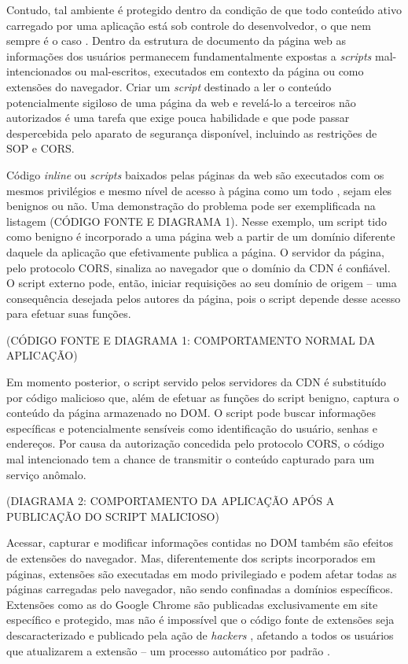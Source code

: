 Contudo, tal ambiente é protegido dentro da condição de que todo conteúdo ativo carregado por uma aplicação está sob controle do desenvolvedor, o que nem sempre é o caso \cite{Heule2015_Most_Dangerous_Code}. Dentro da estrutura de documento da página web as informações dos usuários permanecem fundamentalmente expostas a \textit{scripts} mal-intencionados ou mal-escritos, executados em contexto da página ou como extensões do navegador. Criar um \textit{script} destinado a ler o conteúdo potencialmente sigiloso de uma página da web e revelá-lo a terceiros não autorizados é uma tarefa que exige pouca habilidade e que pode passar despercebida pelo aparato de segurança disponível, incluindo as restrições de SOP e CORS.

Código \textit{inline} ou \textit{scripts} baixados pelas páginas da web são executados com os mesmos privilégios e mesmo nível de acesso à página como um todo \cite[p. 2-3]{DeRyck2012}, sejam eles benignos ou não. Uma demonstração do problema pode ser exemplificada na listagem (CÓDIGO FONTE E DIAGRAMA 1). Nesse exemplo, um script tido como benigno é incorporado a uma página web a partir de um domínio diferente daquele da aplicação que efetivamente publica a página. O servidor da página, pelo protocolo CORS, sinaliza ao navegador que o domínio da CDN é confiável. O script externo pode, então, iniciar requisições ao seu domínio de origem -- uma consequência desejada pelos autores da página, pois o script depende desse acesso para efetuar suas funções.

(CÓDIGO FONTE E DIAGRAMA 1: COMPORTAMENTO NORMAL DA APLICAÇÃO)

Em momento posterior, o script servido pelos servidores da CDN é substituído por código malicioso que, além de efetuar as funções do script benigno, captura o conteúdo da página armazenado no DOM. O script pode buscar informações específicas e potencialmente sensíveis como identificação do usuário, senhas e endereços. Por causa da autorização concedida pelo protocolo CORS, o código mal intencionado tem a chance de transmitir o conteúdo capturado para um serviço anômalo.

(DIAGRAMA 2: COMPORTAMENTO DA APLICAÇÃO APÓS A PUBLICAÇÃO DO SCRIPT MALICIOSO)

Acessar, capturar e modificar informações contidas no DOM também são efeitos de extensões do navegador. Mas, diferentemente dos scripts incorporados em páginas, extensões são executadas em modo privilegiado e podem afetar todas as páginas carregadas pelo navegador, não sendo confinadas a domínios específicos. Extensões como as do Google Chrome são publicadas exclusivamente em site específico e protegido, mas não é impossível que o código fonte de extensões seja descaracterizado e publicado pela ação de \textit{hackers} \cite{Spring2017}, afetando a todos os usuários que atualizarem a extensão -- um processo automático por padrão \cite{Google2017}. 

